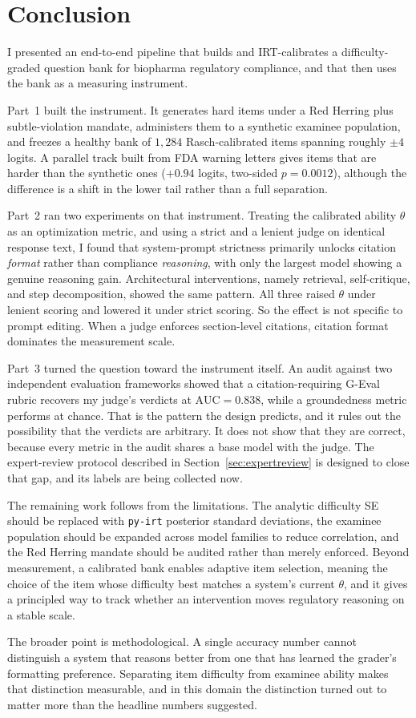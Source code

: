 \section{Conclusion}
\label{sec:conclusion}

I presented an end-to-end pipeline that builds and IRT-calibrates a
difficulty-graded question bank for biopharma regulatory compliance, and
that then uses the bank as a measuring instrument.

Part~1 built the instrument. It generates hard items under a Red Herring
plus subtle-violation mandate, administers them to a synthetic examinee
population, and freezes a healthy bank of $1{,}284$ Rasch-calibrated
items spanning roughly $\pm 4$ logits. A parallel track built from FDA
warning letters gives items that are harder than the synthetic ones
($+0.94$ logits, two-sided $p = 0.0012$), although the difference is a
shift in the lower tail rather than a full separation.

Part~2 ran two experiments on that instrument. Treating the calibrated
ability $\theta$ as an optimization metric, and using a strict and a
lenient judge on identical response text, I found that system-prompt
strictness primarily unlocks citation \emph{format} rather than
compliance \emph{reasoning}, with only the largest model showing a
genuine reasoning gain. Architectural interventions, namely retrieval,
self-critique, and step decomposition, showed the same pattern. All three
raised $\theta$ under lenient scoring and lowered it under strict
scoring. So the effect is not specific to prompt editing. When a judge
enforces section-level citations, citation format dominates the
measurement scale.

Part~3 turned the question toward the instrument itself. An audit against
two independent evaluation frameworks showed that a citation-requiring
G-Eval rubric recovers my judge's verdicts at $\mathrm{AUC} = 0.838$,
while a groundedness metric performs at chance. That is the pattern the
design predicts, and it rules out the possibility that the verdicts are
arbitrary. It does not show that they are correct, because every metric
in the audit shares a base model with the judge. The expert-review
protocol described in Section~\ref{sec:expertreview} is designed to close
that gap, and its labels are being collected now.

The remaining work follows from the limitations. The analytic difficulty
SE should be replaced with \texttt{py-irt} posterior standard deviations,
the examinee population should be expanded across model families to
reduce correlation, and the Red Herring mandate should be audited rather
than merely enforced. Beyond measurement, a calibrated bank enables
adaptive item selection, meaning the choice of the item whose difficulty
best matches a system's current $\theta$, and it gives a principled way
to track whether an intervention moves regulatory reasoning on a stable
scale.

The broader point is methodological. A single accuracy number cannot
distinguish a system that reasons better from one that has learned the
grader's formatting preference. Separating item difficulty from examinee
ability makes that distinction measurable, and in this domain the
distinction turned out to matter more than the headline numbers
suggested.
